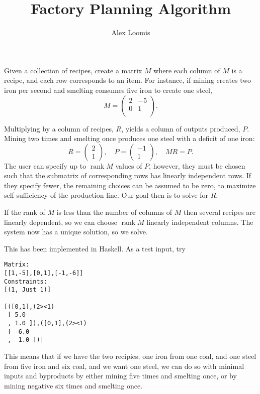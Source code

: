 \documentclass[12pt]{article}
\title{Factory Planning Algorithm}
\author{Alex Loomis}
\DeclareMathOperator\rank{rank}
\begin{document}
\maketitle

Given a collection of recipes,
create a matrix $M$ where each column of $M$ is a recipe,
and each row corresponds to an item.
For instance, if mining creates two iron per second
and smelting consumes five iron to create one steel,
\[
  M = \begin{pmatrix}
    2 & -5 \\
    0 & 1 \\
  \end{pmatrix}.
\]

Multiplying by a column of recipes, $R$,
yields a column of outputs produced, $P$.
Mining two times and smelting once produces
one steel with a deficit of one iron:
\[
  R = \begin{pmatrix} 2 \\ 1 \end{pmatrix}, \quad
  P = \begin{pmatrix} -1 \\ 1 \end{pmatrix}, \quad
  MR = P.
\]
The user can specify up to $\rank M$ values of $P$, however,
they must be chosen such that the submatrix of corresponding rows
has linearly independent rows.
If they specify fewer, the remaining choices can be assumed to be zero,
to maximize self-sufficiency of the production line.
Our goal then is to solve for $R$.

If the rank of $M$ is less than the number of columns of $M$
then several recipes are linearly dependent,
so we can choose $\rank M$ linearly independent columns.
The system now has a unique solution, so we solve.

This has been implemented in Haskell.
As a test input, try
\begin{verbatim}
Matrix:
[[1,-5],[0,1],[-1,-6]]
Constraints:
[(1, Just 1)]

[([0,1],(2><1)
 [ 5.0
 , 1.0 ]),([0,1],(2><1)
 [ -6.0
 ,  1.0 ])]
\end{verbatim}
This means that if we have the two recipies;
one iron from one coal,
and one steel from five iron and six coal,
and we want one steel,
we can do so with minimal inputs and byproducts by
either mining five times and smelting once,
or by mining negative six times and smelting once.
\end{document}
